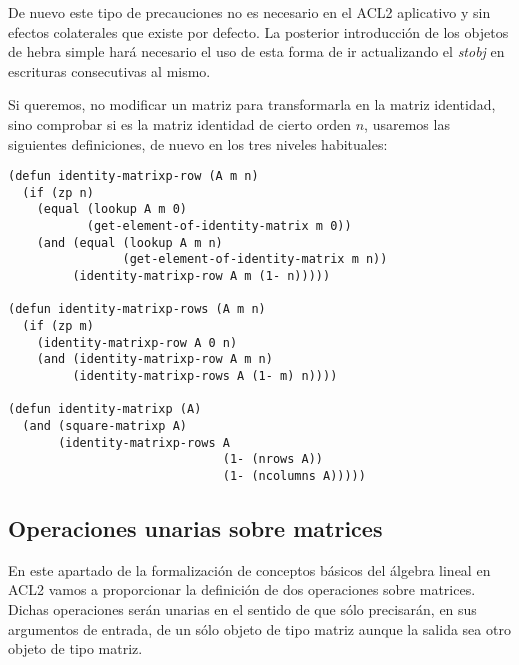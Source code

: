\documentclass[a4paper,10pt]{article}
\begin{document}
\par \vspace{10pt}		

De nuevo este tipo de precauciones no es necesario en el ACL2 aplicativo y sin efectos colaterales que existe por defecto. La posterior introducción de los objetos de hebra simple hará necesario el uso de esta forma de ir actualizando el \emph{stobj} en escrituras consecutivas al mismo.

\par \vspace{10pt}		

Si queremos, no modificar un matriz para transformarla en la matriz identidad, sino comprobar si es la matriz identidad de cierto orden $n$, usaremos las siguientes definiciones, de nuevo en los tres niveles habituales:

\par \vspace{10pt}		

\begin{lstlisting}[language=clips]
(defun identity-matrixp-row (A m n)
  (if (zp n)
    (equal (lookup A m 0) 
           (get-element-of-identity-matrix m 0))
    (and (equal (lookup A m n) 
                (get-element-of-identity-matrix m n))
         (identity-matrixp-row A m (1- n)))))
  
(defun identity-matrixp-rows (A m n)
  (if (zp m)
    (identity-matrixp-row A 0 n)
    (and (identity-matrixp-row A m n)
         (identity-matrixp-rows A (1- m) n))))
   
(defun identity-matrixp (A)
  (and (square-matrixp A)
       (identity-matrixp-rows A 
                              (1- (nrows A)) 
                              (1- (ncolumns A)))))
\end{lstlisting}

\vspace{12pt}
\subsection{Operaciones unarias sobre matrices}
\vspace{10pt}

En este apartado de la formalización de conceptos básicos del álgebra lineal en ACL2 vamos a proporcionar la definición de dos operaciones sobre matrices. Dichas operaciones serán unarias en el sentido de que sólo precisarán, en sus argumentos de entrada, de un sólo objeto de tipo matriz aunque la salida sea otro objeto de tipo matriz.
\end{document}
